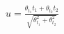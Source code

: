 \documentclass[border=2pt]{standalone}
\begin{document}
\Large
\(u = \frac{\theta_{t_1}t_1+\theta_{t_2}t_2}{\sqrt{\theta_{t_1}^{2}+\theta_{t_2}^{2}}}\)
\end{document}
